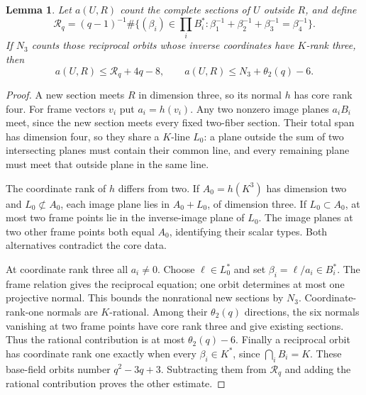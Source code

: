\documentclass[12pt,letterpaper,onecolumn]{article}
\newtheorem{lemma}[theorem]{Lemma}
\theoremstyle{definition}
\theoremstyle{remark}
\begin{document}
\begin{lemma}\label{lem:core-four-new}
Let \(a(U,R)\) count the complete sections of \(U\) outside \(R\), and define
\[
\mathcal R_q=(q-1)^{-1}
\#\{(\beta_i)\in\textstyle\prod_iB_i^*:
\beta_1^{-1}+\beta_2^{-1}+\beta_3^{-1}=\beta_4^{-1}\}.
\]
If \(N_3\) counts those reciprocal orbits whose inverse coordinates have \(K\)-rank three, then
\[
a(U,R)\le\mathcal R_q+4q-8,
\qquad a(U,R)\le N_3+\theta_2(q)-6.
\]
\end{lemma}
\begin{proof}
A new section meets \(R\) in dimension three, so its normal \(h\) has core rank four.
For frame vectors \(v_i\) put \(a_i=h(v_i)\).
Any two nonzero image planes \(a_iB_i\) meet, since the new section meets every fixed two-fiber section.
Their total span has dimension four, so they share a \(K\)-line \(L_0\): a plane outside the sum of two intersecting planes must contain their common line, and every remaining plane must meet that outside plane in the same line.

The coordinate rank of \(h\) differs from two.
If \(A_0=h(K^3)\) has dimension two and \(L_0\not\subset A_0\), each image plane lies in \(A_0+L_0\), of dimension three.
If \(L_0\subset A_0\), at most two frame points lie in the inverse-image plane of \(L_0\).
The image planes at two other frame points both equal \(A_0\), identifying their scalar types.
Both alternatives contradict the core data.

At coordinate rank three all \(a_i\ne0\). Choose \(\ell\in L_0^*\) and set \(\beta_i=\ell/a_i\in B_i^*\).
The frame relation gives the reciprocal equation; one orbit determines at most one projective normal.
This bounds the nonrational new sections by \(N_3\).
Coordinate-rank-one normals are \(K\)-rational. Among their \(\theta_2(q)\) directions, the six normals vanishing at two frame points have core rank three and give existing sections.
Thus the rational contribution is at most \(\theta_2(q)-6\).
Finally a reciprocal orbit has coordinate rank one exactly when every \(\beta_i\in K^*\), since \(\bigcap_iB_i=K\).
These base-field orbits number \(q^2-3q+3\).
Subtracting them from \(\mathcal R_q\) and adding the rational contribution proves the other estimate.
\end{proof}
\end{document}
